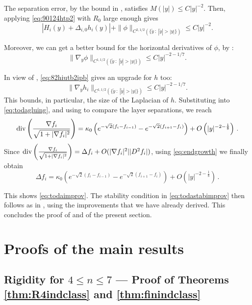 \documentclass{article}
\theoremstyle{definition}
\begin{document}
The separation error, by the bound in \cite[Proposition 10.1]{WW19}, satisfies $M(|y|) \leq C |y|^{-2}$. Then, applying \eqref{eq:90124htp2} with $R_0$ large enough gives
\begin{equation*}
|H_i(y) + \Delta_{i,0} h_i(y)| + \|\phi\|_{C^{2,1/2}(\{\widetilde y\ :\ |\widetilde y|>|y|\})} \leq C |y|^{-2}.
\end{equation*}

Moreover, we can get a better bound for the horizontal derivatives of $\phi$, by \cite[Proposition 7.1]{WW19}:
\begin{equation}\label{eq:82hiutb2ipb}
\|\nabla_y \phi\|_{C^{1,1/2}(\{\widetilde y\ :\ |\widetilde y|>|y|\})} \leq C |y|^{-2 - 1/7}.
\end{equation}

In view of , \eqref{eq:82hiutb2ipb} gives an upgrade for $h$ too:
\begin{equation*}
\|\nabla_{y} h_i\|_{C^{1,1/2}(\{\widetilde y\ :\ |\widetilde y|>|y|\})} \leq C |y|^{-2 - 1/7}.
\end{equation*}
This bounds, in particular, the size of the Laplacian of $h$. Substituting into \eqref{eq:todagluing}, and using  to compare the layer separations, we reach
\begin{equation*}
{\rm div}\left(\frac{\nabla f_{i}}{\sqrt{1+|\nabla f_i|^2}}\right) = \kappa_0 \left(e^{-\sqrt{2}(f_i - f_{i-1})} - e^{-\sqrt{2}(f_{i+1} - f_i)}\right) + O\left(|y|^{-2 - \frac{1}{8}}\right)\,.
\end{equation*}
Since ${\rm div}\left(\frac{\nabla f_{i}}{\sqrt{1+|\nabla f_i|^2}}\right)=\Delta f_{i}+O(|\nabla f_i|^2||D^2f_i|)$, using \eqref{eq:endgrowth} we finally obtain
\begin{equation*}
\Delta f_{i} = \kappa_0 \left(e^{-\sqrt{2}(f_i - f_{i-1})} - e^{-\sqrt{2}(f_{i+1} - f_i)}\right) + O\left(|y|^{-2 - \frac{1}{8}}\right)\,.
\end{equation*}

This shows \eqref{eq:todaimprov}. The stability condition in \eqref{eq:todastabimprov} then follows as in \cite[Proposition 8.1]{WW19}, using the improvements that we have already derived. This concludes the proof of  and of the present section.

\section{Proofs of the main results}
\subsection{Rigidity for $4 \leq n \leq 7$ --- Proof of Theorems \ref{thm:R4indclass} and \ref{thm:finindclass}}\label{sec:finindclass}
\end{document}
